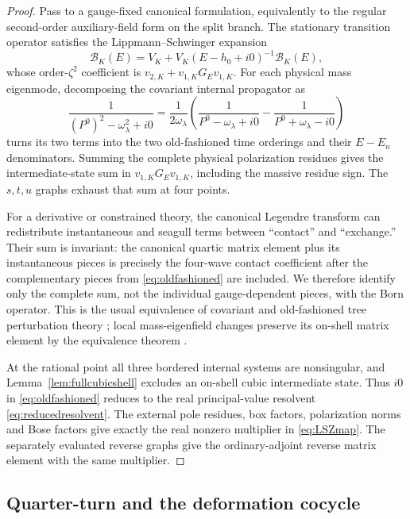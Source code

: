 \documentclass[11pt]{article}
\theoremstyle{definition}
\theoremstyle{remark}
\newcommand{\Born}{\mathcal B}
\begin{document}
\begin{proof}
Pass to a gauge-fixed canonical formulation, equivalently to the regular
second-order auxiliary-field form on the split branch.  The stationary
transition operator satisfies the Lippmann--Schwinger expansion
\begin{equation}
\Born_K(E)=V_K+V_K(E-h_0+i0)^{-1}\Born_K(E),
\end{equation}
whose order-$\zeta^2$ coefficient is $v_{2,K}+v_{1,K}G_Ev_{1,K}$.
For each physical mass eigenmode, decomposing the covariant internal
propagator as
\begin{equation}\label{eq:oldfashioned}
\frac{1}{(P^0)^2-\omega_\lambda^2+i0}
=\frac{1}{2\omega_\lambda}
\left(\frac{1}{P^0-\omega_\lambda+i0}
-\frac{1}{P^0+\omega_\lambda-i0}\right)
\end{equation}
turns its two terms into the two old-fashioned time orderings and their
$E-E_n$ denominators.  Summing the complete physical polarization
residues gives the intermediate-state sum in $v_{1,K}G_Ev_{1,K}$,
including the massive residue sign.  The $s,t,u$ graphs exhaust that sum
at four points.

For a derivative or constrained theory, the canonical Legendre transform
can redistribute instantaneous and seagull terms between ``contact'' and
``exchange.''  Their sum is invariant: the canonical quartic matrix
element plus its instantaneous pieces is precisely the four-wave contact
coefficient after the complementary pieces from \eqref{eq:oldfashioned}
are included.  We therefore identify only the complete sum, not the
individual gauge-dependent pieces, with the Born operator.  This is the
usual equivalence of covariant and old-fashioned tree perturbation theory
\cite{WeinbergQFT}; local mass-eigenfield changes preserve its on-shell
matrix element by the equivalence theorem \cite{KOS}.

At the rational point all three bordered internal systems are
nonsingular, and Lemma~\ref{lem:fullcubicshell} excludes an on-shell
cubic intermediate state.  Thus $i0$ in \eqref{eq:oldfashioned} reduces
to the real principal-value resolvent \eqref{eq:reducedresolvent}.  The
external pole residues, box factors, polarization norms and Bose factors
give exactly the real nonzero multiplier in \eqref{eq:LSZmap}.  The
separately evaluated reverse graphs give the ordinary-adjoint reverse
matrix element with the same multiplier.
\end{proof}

\subsection{Quarter-turn and the deformation cocycle}
\end{document}
